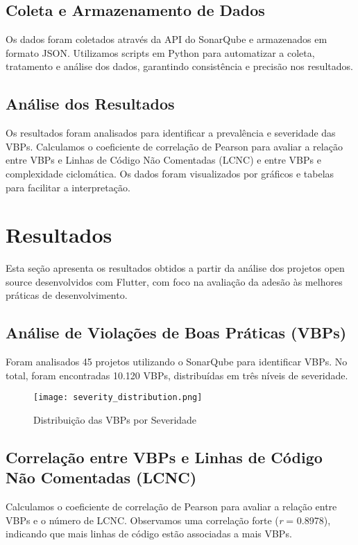 \documentclass[12pt]{article}
\begin{document}
\subsection{Coleta e Armazenamento de Dados}
Os dados foram coletados através da API do SonarQube e armazenados em formato JSON. Utilizamos scripts em Python para automatizar a coleta, tratamento e análise dos dados, garantindo consistência e precisão nos resultados.

\subsection{Análise dos Resultados}
Os resultados foram analisados para identificar a prevalência e severidade das VBPs. Calculamos o coeficiente de correlação de Pearson para avaliar a relação entre VBPs e Linhas de Código Não Comentadas (LCNC) e entre VBPs e complexidade ciclomática. Os dados foram visualizados por gráficos e tabelas para facilitar a interpretação.

\section{Resultados}

Esta seção apresenta os resultados obtidos a partir da análise dos projetos open source desenvolvidos com Flutter, com foco na avaliação da adesão às melhores práticas de desenvolvimento.

\subsection{Análise de Violações de Boas Práticas (VBPs)}
Foram analisados 45 projetos utilizando o SonarQube para identificar VBPs. No total, foram encontradas 10.120 VBPs, distribuídas em três níveis de severidade.

\begin{figure}[H]
\centering
\texttt{[image: severity\_distribution.png]}
\caption{Distribuição das VBPs por Severidade}
\label{fig:vbps_severity_distribution}
\end{figure}

\subsection{Correlação entre VBPs e Linhas de Código Não Comentadas (LCNC)}
Calculamos o coeficiente de correlação de Pearson para avaliar a relação entre VBPs e o número de LCNC. Observamos uma correlação forte (\textit{r} = 0.8978), indicando que mais linhas de código estão associadas a mais VBPs.
\end{document}
